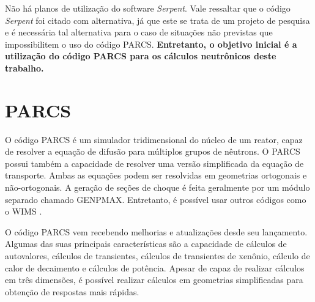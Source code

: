 \documentclass[12pt,openright,twoside,a4paper,english,french,spanish,brazil]{abntex2}
\begin{document}
Não há planos de utilização do software \textit{Serpent}. Vale ressaltar que o código \textit{Serpent} foi 
citado com alternativa, já que este se trata de um projeto de pesquisa e é necessária tal alternativa para 
o caso de situações não previstas que impossibilitem o uso do código PARCS. \textbf{Entretanto, o objetivo inicial 
é a utilização do código PARCS para os cálculos neutrônicos deste trabalho.}

\chapter{PARCS}
\label{chap:PARCS}

O código PARCS \cite{PARCS2006} é um simulador tridimensional do núcleo de um reator, capaz de resolver 
a equação de difusão para múltiplos grupos de nêutrons. O PARCS possui também a capacidade de resolver 
uma versão simplificada da equação de transporte. Ambas as equações podem ser resolvidas em geometrias 
ortogonais e não-ortogonais. A geração de seções de choque é feita geralmente por um módulo separado chamado 
GENPMAX. Entretanto, é possível usar outros códigos como o WIMS \cite{Newton2002}.

O código PARCS vem recebendo melhorias e atualizações desde seu lançamento. Algumas das suas 
principais características são a capacidade de cálculos de autovalores, cálculos de transientes, 
cálculos de transientes de xenônio, cálculo de calor de decaimento e cálculos de potência. Apesar 
de capaz de realizar cálculos em três dimensões, é possível realizar cálculos em geometrias 
simplificadas para obtenção de respostas mais rápidas.

\end{document}
